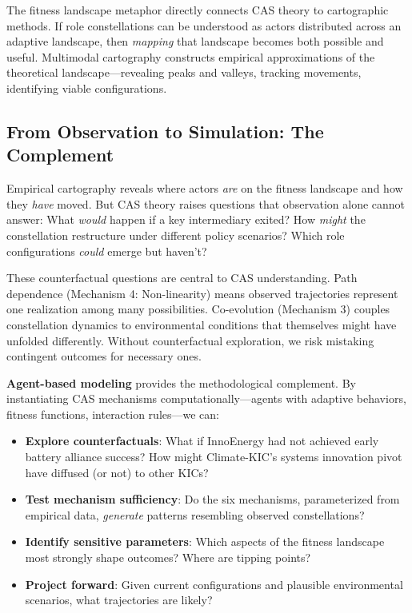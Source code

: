 \documentclass[../main.tex]{subfiles}
\begin{document}
\begin{insightbox}
The fitness landscape metaphor directly connects CAS theory to cartographic methods. If role constellations can be understood as actors distributed across an adaptive landscape, then \emph{mapping} that landscape becomes both possible and useful. Multimodal cartography constructs empirical approximations of the theoretical landscape---revealing peaks and valleys, tracking movements, identifying viable configurations.
\end{insightbox}

\subsection{From Observation to Simulation: The \RoleSim Complement}

Empirical cartography reveals where actors \emph{are} on the fitness landscape and how they \emph{have} moved. But CAS theory raises questions that observation alone cannot answer: What \emph{would} happen if a key intermediary exited? How \emph{might} the constellation restructure under different policy scenarios? Which role configurations \emph{could} emerge but haven't?

These counterfactual questions are central to CAS understanding. Path dependence (Mechanism 4: Non-linearity) means observed trajectories represent one realization among many possibilities. Co-evolution (Mechanism 3) couples constellation dynamics to environmental conditions that themselves might have unfolded differently. Without counterfactual exploration, we risk mistaking contingent outcomes for necessary ones.

\textbf{Agent-based modeling} provides the methodological complement. By instantiating CAS mechanisms computationally---agents with adaptive behaviors, fitness functions, interaction rules---we can:

\begin{itemize}[leftmargin=*, itemsep=0.2em]
\item \textbf{Explore counterfactuals}: What if InnoEnergy had not achieved early battery alliance success? How might Climate-KIC's systems innovation pivot have diffused (or not) to other KICs?
\item \textbf{Test mechanism sufficiency}: Do the six mechanisms, parameterized from empirical data, \emph{generate} patterns resembling observed constellations?
\item \textbf{Identify sensitive parameters}: Which aspects of the fitness landscape most strongly shape outcomes? Where are tipping points?
\item \textbf{Project forward}: Given current configurations and plausible environmental scenarios, what trajectories are likely?
\end{itemize}
\end{document}
